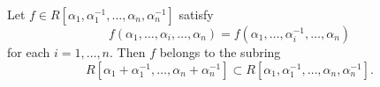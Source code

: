 Let $f \in R[\alpha_1, \alpha_1^{-1}, \ldots, \alpha_n, \alpha_n^{-1}]$ satisfy
$$
f(\alpha_1, \ldots, \alpha_i, \ldots, \alpha_n) = f(\alpha_1, \ldots, \alpha_i^{-1}, \ldots, \alpha_n)
$$
for each $i = 1, \ldots, n$. Then $f$ belongs to the subring
$$
R[\alpha_1 + \alpha_1^{-1}, \ldots, \alpha_n + \alpha_n^{-1}] \subset R[\alpha_1, \alpha_1^{-1}, \ldots, \alpha_n, \alpha_n^{-1}].
$$
